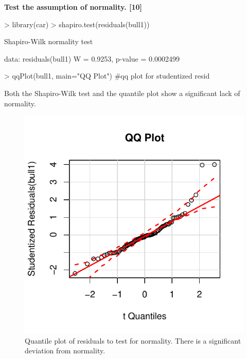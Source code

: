 \documentclass[letterpaper]{article}
\newcounter{qcounter}
\begin{document}
\begin{list}{ \bf {}. }{}
{\item \bf Test the assumption of normality. [10]}
\begin{Schunk}
\begin{Sinput}
> library(car)
> shapiro.test(residuals(bull1))
\end{Sinput}
\begin{Soutput}
	Shapiro-Wilk normality test

data:  residuals(bull1)
W = 0.9253, p-value = 0.0002499
\end{Soutput}
\end{Schunk}
\begin{Schunk}
\begin{Sinput}
> qqPlot(bull1, main="QQ Plot") #qq plot for studentized resid
\end{Sinput}
\end{Schunk}
Both the Shapiro-Wilk test and the quantile plot show a significant lack of normality.


\begin{figure}
\begin{center}
\includegraphics{HW04BullsKey-figqq}
\end{center}
\caption{Quantile plot of residuals to test for normality. There is a significant deviation from normality.}
\label{fig:qq}
\end{figure}


\end{list}
\end{document}
